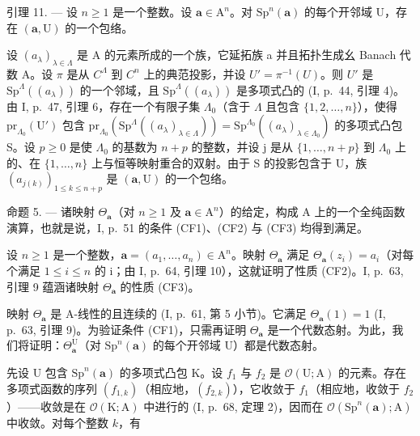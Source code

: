 引理 11. --- 设 \(n \geqslant 1\) 是一个整数。设 \(\boldsymbol{a} \in \mathrm{A}^{n}\)。对 \(\mathrm{Sp}^{n}(\boldsymbol{a})\) 的每个开邻域 U，存在 \((\boldsymbol{a}, \mathrm{U})\) 的一个包络。

设 \((a_{\lambda})_{\lambda\in\Lambda}\) 是 A 的元素所成的一个族，它延拓族 a 并且拓扑生成幺 Banach 代数 A。设 \(\pi\) 是从 \(C^{\Lambda}\) 到 \(C^{n}\) 上的典范投影，并设 \(U'=\pi^{-1}(U)\)。则 \(U'\) 是 \(\mathrm{Sp}^{\Lambda}((a_{\lambda}))\) 的一个邻域，且 \(\mathrm{Sp}^{\Lambda}((a_{\lambda}))\) 是多项式凸的 (I, p.~44, 引理 4)。由 I, p.~47, 引理 6，存在一个有限子集 \(\Lambda_{0}\)（含于 \(\Lambda\) 且包含 \(\{1,2,\ldots,n\}\)），使得 \(\mathrm{pr}_{\Lambda_{0}}(\mathrm{U}')\) 包含 \(\mathrm{pr}_{\Lambda_{0}}(\mathrm{Sp}^{\Lambda}((a_{\lambda})_{\lambda\in\Lambda}))=\mathrm{Sp}^{\Lambda_{0}}((a_{\lambda})_{\lambda\in\Lambda_{0}})\) 的多项式凸包 S。设 \(p\geqslant0\) 是使 \(\Lambda_{0}\) 的基数为 \(n+p\) 的整数，并设 j 是从 \(\{1,\ldots,n+p\}\) 到 \(\Lambda_{0}\) 上的、在 \(\{1,\ldots,n\}\) 上与恒等映射重合的双射。由于 S 的投影包含于 U，族 \((a_{j(k)})_{1\leqslant k\leqslant n+p}\) 是 \((\boldsymbol{a},\mathrm{U})\) 的一个包络。

命题 5. --- 诸映射 \(\Theta_{\boldsymbol{a}}\)（对 \(n \geqslant 1\) 及 \(\boldsymbol{a} \in \mathrm{A}^{n}\)）的给定，构成 A 上的一个全纯函数演算，也就是说，I, p.~51 的条件 (CF1)、(CF2) 与 (CF3) 均得到满足。

设 \(n \geqslant 1\) 是一个整数，\(\boldsymbol{a} = (a_{1}, \ldots, a_{n}) \in \mathrm{A}^{n}\)。映射 \(\Theta_{\boldsymbol{a}}\) 满足 \(\Theta_{\boldsymbol{a}}(z_{i}) = a_{i}\)（对每个满足 \(1 \leqslant i \leqslant n\) 的 i；由 I, p.~64, 引理 10），这就证明了性质 (CF2)。I, p.~63, 引理 9 蕴涵诸映射 \(\Theta_{\boldsymbol{a}}\) 的性质 (CF3)。

映射 \(\Theta_{\pmb{a}}\) 是 A-线性的且连续的 (I, p.~61, 第 5 小节)。它满足 \(\Theta_{\pmb{a}}(1) = 1\) (I, p.~63, 引理 9)。为验证条件 (CF1)，只需再证明 \(\Theta_{\pmb{a}}\) 是一个代数态射。为此，我们将证明：\(\Theta_{\pmb{a}}^{\mathrm{U}}\)（对 \(\mathrm{Sp}^{n}(\pmb{a})\) 的每个开邻域 U）都是代数态射。

先设 U 包含 \(\mathrm{Sp}^{n}(\boldsymbol{a})\) 的多项式凸包 K。设 \(f_{1}\) 与 \(f_{2}\) 是 \(\mathcal{O}(\mathrm{U};\mathrm{A})\) 的元素。存在多项式函数的序列 \((f_{1,k})\)（相应地，\((f_{2,k})\)），它收敛于 \(f_{1}\)（相应地，收敛于 \(f_{2}\)）——收敛是在 \(\mathcal{O}(\mathrm{K};\mathrm{A})\) 中进行的 (I, p.~68, 定理 2)，因而在 \(\mathcal{O}(\mathrm{Sp}^{n}(\boldsymbol{a});\mathrm{A})\) 中收敛。对每个整数 \(k\)，有

